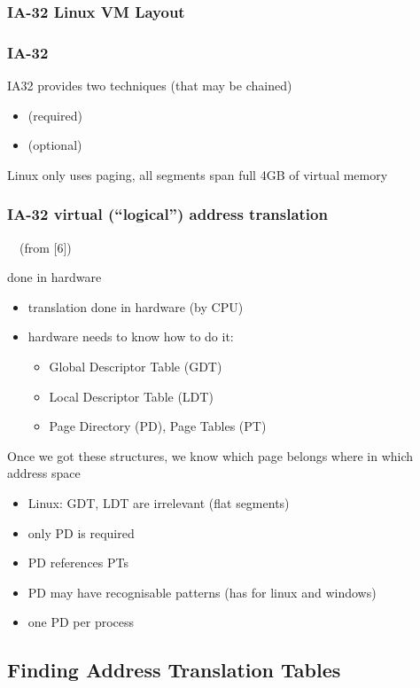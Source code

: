 \documentclass{beamer}
\newenvironment{itemizeframe}[1]
  {\begin{frame}{#1}\startitemizeframe}
  {\stopitemizeframe\end{frame}}
\newcommand\startitemizeframe{\begin{itemize}}
\newcommand\stopitemizeframe{\end{itemize}}
\begin{document}
		\begin{frame} \frametitle{IA-32 Linux VM Layout}
		\end{frame}

		\begin{frame} \frametitle{IA-32}
			IA32 provides two techniques (that may be chained)
			\begin{itemize}
				\item {} (required)
				\item {} (optional)
			\end{itemize}
			Linux only uses paging, all segments span full 4GB of virtual memory
		\end{frame}

		\begin{frame} \frametitle{IA-32 virtual (``logical'') address translation}
			 ~~(from [6])
		\end{frame}

		\begin{itemizeframe}{done in hardware}
			\item translation done in hardware (by CPU)
			\item hardware needs to know how to do it:
			\begin{itemize}
				\item Global Descriptor Table (GDT)
				\item Local Descriptor Table (LDT)
				\item Page Directory (PD), Page Tables (PT)
			\end{itemize}
		\end{itemizeframe}

		\begin{frame}
			Once we got these structures,
			we know which page belongs where in which address space
			\begin{itemize}
				\item Linux: GDT, LDT are irrelevant (flat segments)
				\item only PD is required
				\item PD references PTs
				\item<2-> PD may have recognisable patterns (has for linux and windows)
				\item<2-> one PD per process
			\end{itemize}
		\end{frame}
	
	\subsection{Finding Address Translation Tables}
		
\end{document}
